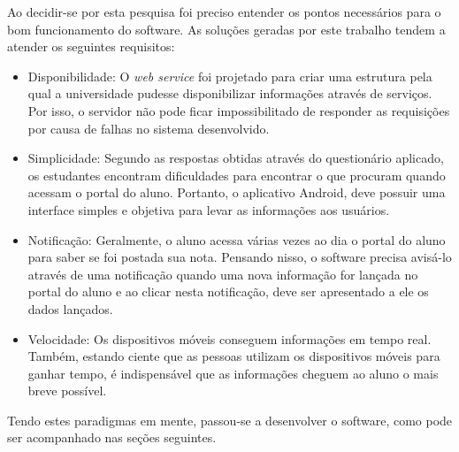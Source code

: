 	\par Ao decidir-se por esta pesquisa foi preciso entender os pontos
necessários para o bom funcionamento do software. As soluções geradas por este
trabalho tendem a atender os seguintes requisitos:

	\begin{itemize}
		\item Disponibilidade: O \textit{web service} foi projetado para criar uma
		estrutura pela qual a universidade pudesse disponibilizar informações através
		de serviços. Por isso, o servidor não pode ficar impossibilitado de responder
		as requisições por causa de falhas no sistema desenvolvido.
		\item Simplicidade: Segundo as respostas obtidas através do questionário
		aplicado, os estudantes encontram dificuldades para encontrar o que procuram
		quando acessam o portal do aluno. Portanto, o aplicativo Android, deve possuir
		uma interface simples e objetiva para levar as informações aos usuários.
		\item Notificação: Geralmente, o aluno acessa várias vezes ao dia o portal do
		aluno para saber se foi postada sua nota. Pensando nisso, o software precisa
		avisá-lo através de uma notificação quando uma nova informação for lançada no
		portal do aluno e ao clicar nesta notificação, deve ser apresentado a ele os
		dados lançados.
		\item Velocidade: Os dispositivos móveis conseguem informações em tempo real.
		Também, estando ciente que as pessoas utilizam os dispositivos móveis para
		ganhar tempo, é indispensável que as informações cheguem ao aluno o mais breve
		possível.
	\end{itemize}

	\par Tendo estes paradigmas em mente, passou-se a desenvolver o software, como
pode ser acompanhado nas seções seguintes.
